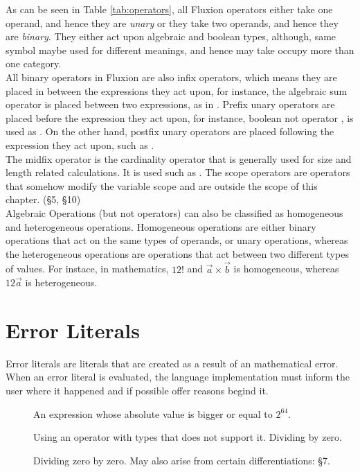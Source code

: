 \documentclass[11pt,a4paper]{book}
\begin{document}
As can be seen in Table \ref{tab:operators}, all Fluxion operators either take one operand, and hence they are \textit{unary} or they take two operands, and hence they are \textit{binary}. They either act upon algebraic and boolean types, although, same symbol maybe used for different meanings, and hence may take occupy more than one category. \\

All binary operators in Fluxion are also infix operators, which means they are placed in between the expressions they act upon, for instance, the algebraic sum operator \code{+} is placed between two expressions, as in . Prefix unary operators are placed before the expression they act upon, for instance, boolean not operator \code{\textbackslash}, is used as . On the other hand, postfix unary operators are placed following the expression they act upon, such as . \\

The midfix operator is the cardinality operator that is generally used for size and length related calculations. It is used such as . The scope operators are operators that somehow modify the variable scope and are outside the scope of this chapter. (\S 5, \S 10) \\

Algebraic Operations (but not operators) can also be classified as homogeneous and heterogeneous operations. Homogeneous operations are either binary operations that act on the same types of operands, or unary operations, whereas the heterogeneous operations are operations that act between two different types of values. For instace, in mathematics, $12!$ and $\vec{a} \times \vec{b}$ is homogeneous, whereas $12\vec{a}$ is heterogeneous. \\

\section{Error Literals}

Error literals are literals that are created as a result of an mathematical error. When an error literal is evaluated, the language implementation must inform the user where it happened and if possible offer reasons begind it.

\begin{description}
\item[] An expression whose absolute value is bigger or equal to $2^{64}$.
\item[] Using an operator with types that does not support it. Dividing by zero.
\item[] Dividing zero by zero. May also arise from certain differentiations: \S 7.
\end{description}
\end{document}
